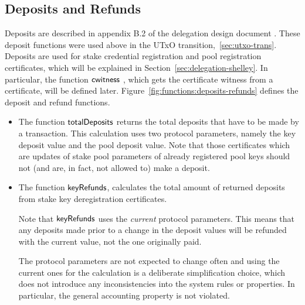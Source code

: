 \clearpage

\subsection{Deposits and Refunds}
\label{sec:deps-refunds}

Deposits are described in appendix B.2 of the delegation design document
\cite{delegation_design}.  These deposit functions were used above in the UTxO
transition,~\ref{sec:utxo-trans}. Deposits are used for stake credential
registration and pool registration certificates, which will be explained in
Section~\ref{sec:delegation-shelley}.  In particular, the function
$\mathsf{cwitness}~ \mathit{}$, which gets the certificate witness from a certificate, will be
defined later.  Figure~\ref{fig:functions:deposits-refunds} defines the deposit
and refund functions.
\begin{itemize}
  \item The function $\mathsf{totalDeposits}$ returns the total deposits that have to be
    made by a transaction.  This calculation uses two protocol parameters, namely
    the key deposit value and the pool deposit value.
    Note that those certificates which are
    updates of stake pool parameters of already registered pool keys should not
    (and are, in fact, not allowed to) make a deposit.
  \item The function $\mathsf{keyRefunds}$, calculates the total amount of returned
    deposits from stake key deregistration certificates.

    Note that $\mathsf{keyRefunds}$ uses the \textit{current} protocol parameters.
    This means that any deposits made prior to a change in the deposit values
    will be refunded with the current value, not the one originally paid.

    The protocol parameters are not
    expected to change often and using the current ones for the calculation
    is a deliberate simplification choice, which does not introduce any inconsistencies
    into the system rules or properties. In particular, the general accounting
    property is not violated.
\end{itemize}

